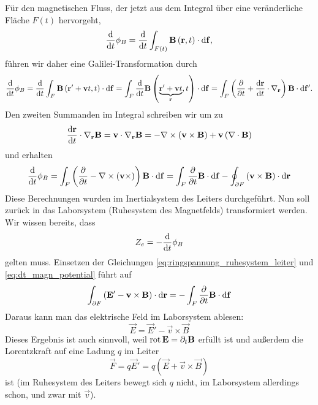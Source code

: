 Für den magnetischen Fluss, der jetzt aus dem Integral über eine veränderliche Fläche $F\left(t\right)$ hervorgeht,
\begin{equation*}
	\frac{\mathop{}\!\mathrm{d} }{\mathop{}\!\mathrm{d} t}\phi _{B}=\frac{\mathop{}\!\mathrm{d} }{\mathop{}\!\mathrm{d} t}\int _{F\left(t\right)}\mathbf{B}\left(\mathbf{r},t\right)\cdot \mathop{}\!\mathrm{d} \mathbf{f},
\end{equation*}
führen wir daher eine Galilei-Transformation durch
\begin{equation*}
	\frac{\diff }{\diff t}\phi _{B}=\frac{\diff }{\diff t}\int _{F}\vec {B}\left(\vec {r}'+\vec {v}t,t\right)\cdot \diff \vec {f}=\int _{F}\frac{\diff }{\diff t}\vec {B}\left(\underset{\vec {r}}{\underbrace{\vec {r}'+\vec {v}t}},t\right)\cdot \diff \vec {f}=\int _{F}\left(\frac{\partial }{\partial t}+\frac{\diff \vec {r}}{\diff t}\cdot \nabla _{\vec {r}}\right)\vec {B}\cdot \diff \vec {f}'.
\end{equation*}
Den zweiten Summanden im Integral schreiben wir um zu
\begin{equation*}
	\frac{\mathop{}\!\mathrm{d} \mathbf{r}}{\mathop{}\!\mathrm{d} t}\cdot \nabla _{\mathbf{r}}\mathbf{B}=\mathbf{v}\cdot \nabla _{\mathbf{r}}\mathbf{B}=-\nabla \times \left(\mathbf{v}\times \mathbf{B}\right)+\mathbf{v}\left(\nabla \cdot \mathbf{B}\right)
\end{equation*}
und erhalten
\begin{equation}
	\label{eq:dt_magn_potential}
	\frac{\mathop{}\!\mathrm{d} }{\mathop{}\!\mathrm{d} t}\phi _{B}=\int _{F}\left(\frac{\partial }{\partial t}-\nabla \times \left(\mathbf{v}\times \right)\right)\mathbf{B}\cdot \mathop{}\!\mathrm{d} \mathbf{f}=\int _{F}\frac{\partial }{\partial t}\mathbf{B}\cdot \mathop{}\!\mathrm{d} \mathbf{f}-\oint _{\partial F}\left(\mathbf{v}\times \mathbf{B}\right)\cdot \mathop{}\!\mathrm{d} \mathbf{r}
\end{equation}
Diese Berechnungen wurden im Inertialsystem des Leiters durchgeführt. Nun soll zurück in das Laborsystem (Ruhesystem des Magnetfelds) transformiert werden. Wir wissen bereits, dass
\begin{equation*}
	Z_{e}=-\frac{\mathop{}\!\mathrm{d} }{\mathop{}\!\mathrm{d} t}\phi _{B}
\end{equation*}
gelten muss. Einsetzen der Gleichungen \eqref{eq:ringspannung_ruhesystem_leiter} und \eqref{eq:dt_magn_potential} führt auf
\begin{equation*}
	\int _{\partial F}\left(\mathbf{E}'-\mathbf{v}\times \mathbf{B}\right)\cdot \mathop{}\!\mathrm{d} \mathbf{r}=-\int _{F}\frac{\partial }{\partial t}\mathbf{B}\cdot \mathop{}\!\mathrm{d} \mathbf{f}
\end{equation*}
Daraus kann man das elektrische Feld im Laborsystem ablesen:
\begin{equation*}
	\vec {E}=\vec {E}'-\vec {v}\times \vec {B}
\end{equation*}
Dieses Ergebnis ist auch sinnvoll, weil $\operatorname{rot} \mathbf{E}=\partial _{t}\mathbf{B}$ erfüllt ist und außerdem die Lorentzkraft auf eine Ladung $q$ im Leiter
\begin{equation*}
	\vec {F}=q\vec {E}'=q\left(\vec {E}+\vec {v}\times \vec {B}\right)
\end{equation*}
ist (im Ruhesystem des Leiters bewegt sich $q$ nicht, im Laborsystem allerdings schon, und zwar mit $\vec {v}$).

